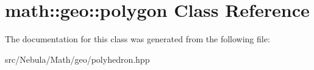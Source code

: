 \hypertarget{classmath_1_1geo_1_1polygon}{\section{math\-:\-:geo\-:\-:polygon \-Class \-Reference}
\label{classmath_1_1geo_1_1polygon}
}


\-The documentation for this class was generated from the following file\-:\begin{DoxyCompactItemize}
\item 
src/\-Nebula/\-Math/geo/polyhedron.\-hpp\end{DoxyCompactItemize}
